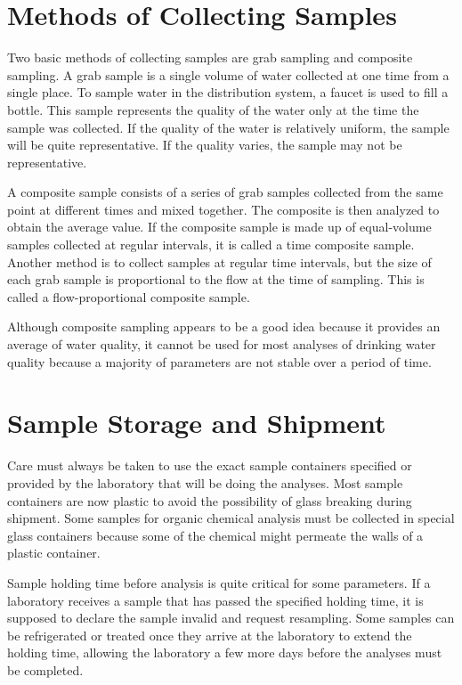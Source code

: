 \documentclass[10pt]{article}
\begin{document}
\section{Methods of Collecting Samples}
Two basic methods of collecting samples are grab sampling and composite sampling. A grab sample is a single volume of water collected at one time from a single place. To sample water in the distribution system, a faucet is used to fill a bottle. This sample represents the quality of the water only at the time the sample was collected. If the quality of the water is relatively uniform, the sample will be quite representative. If the quality varies, the sample may not be representative.

A composite sample consists of a series of grab samples collected from the same point at different times and mixed together. The composite is then analyzed to obtain the average value. If the composite sample is made up of equal-volume samples collected at regular intervals, it is called a time composite sample. Another method is to collect samples at regular time intervals, but the size of each grab sample is proportional to the flow at the time of sampling. This is called a flow-proportional composite sample.

Although composite sampling appears to be a good idea because it provides an average of water quality, it cannot be used for most analyses of drinking water quality because a majority of parameters are not stable over a period of time.

\section{Sample Storage and Shipment}
Care must always be taken to use the exact sample containers specified or provided by the laboratory that will be doing the analyses. Most sample containers are now plastic to avoid the possibility of glass breaking during shipment. Some samples for organic chemical analysis must be collected in special glass containers because some of the chemical might permeate the walls of a plastic container.

Sample holding time before analysis is quite critical for some parameters. If a laboratory receives a sample that has passed the specified holding time, it is supposed to declare the sample invalid and request resampling. Some samples can be refrigerated or treated once they arrive at the laboratory to extend the holding time, allowing the laboratory a few more days before the analyses must be completed.
\end{document}
